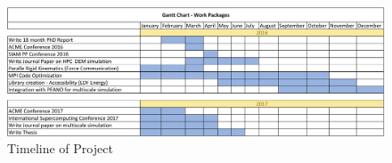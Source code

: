 \documentclass[times,12pt]{article}
\begin{document}
\begin{figure}
\centering
\includegraphics[width=1\textwidth]{chart} \protect\caption{\label{fig8}Timeline of Project}
\end{figure}  

\clearpage
\nocite{*}
{}

\end{document}
